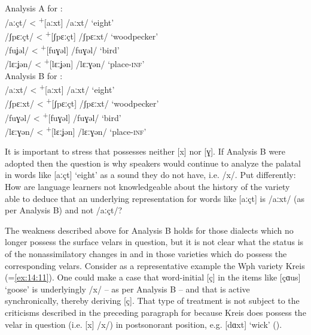 \ea%
\label{ex:14:47}
\ea Analysis A for :\label{ex:14:47a}\\
\relax [aːçt]  /aːçt/        \tab < \tab \textsuperscript{+}[aːxt]     /aːxt/ \tab ‘eight’\\
\relax [ʃpɛːçt]   /ʃpɛːçt/   \tab < \tab \textsuperscript{+}[ʃpɛːçt]   /ʃpɛːxt/ \tab  ‘woodpecker’\\
\relax [fuʝəl]    /fuʝəl/    \tab < \tab  \textsuperscript{+}[fuɣəl]  /fuɣəl/ \tab ‘bird’\\
\relax [lɛːʝən]     /lɛːʝən/ \tab < \tab  \textsuperscript{+}[lɛːʝən]    /lɛːɣən/ \tab ‘place-\textsc{inf}’\\
\ex Analysis B for :\label{ex:14:47b}\\
\relax [aːçt]   /aːxt/    \tab < \tab \textsuperscript{+}[aːxt]  /aːxt/ \tab ‘eight’\\
\relax [ʃpɛːçt] /ʃpɛːxt/  \tab < \tab \textsuperscript{+}[ʃpɛːçt]   /ʃpɛːxt/ \tab  ‘woodpecker’\\
\relax [fujəl]  /fuɣəl/   \tab < \tab  \textsuperscript{+}[fuɣəl]  /fuɣəl/ \tab ‘bird’\\
\relax [lɛːʝən] /lɛːɣən/  \tab < \tab  \textsuperscript{+}[lɛːʝən]    /lɛːɣən/ \tab ‘place-\textsc{inf}’
\z 
\z 

It is important to stress that  possesses neither [x] nor [ɣ]. If Analysis B were adopted then the question is why speakers would continue to analyze the palatal in words like [aːçt] ‘eight’ as a sound they do not have, i.e. /x/. Put differently: How are language learners not knowledgeable about the history of the  variety able to deduce that an underlying representation for words like [aːçt] is /aːxt/ (as per Analysis B) and not /aːçt/?

The weakness described above for Analysis B holds for those dialects which no longer possess the surface velars in question, but it is not clear what the status is of the nonassimilatory changes in  and  in those varieties which do possess the corresponding velars. Consider as a representative example the Wph variety Kreis  (=\ref{ex:14:11}). One could make a case that word-initial [ç] in the items like [çɑus] ‘goose’ is underlyingly /x/ -- as per Analysis B -- and that  is active synchronically, thereby deriving [ç]. That type of treatment is not subject to the criticisms described in the preceding paragraph for  because Kreis  does possess the velar in question (i.e. [x] /x/) in postsonorant position, e.g. [dɑxt] ‘wick’ ().

